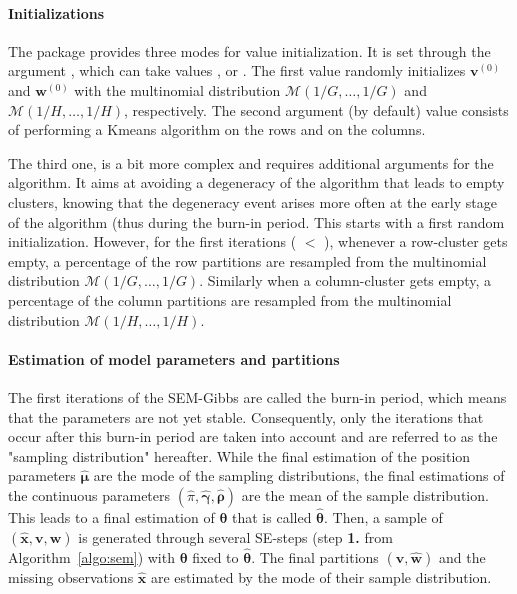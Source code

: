 \paragraph{Initializations} The  package provides three modes for value initialization. It is set through the argument , which can take values ,  or . The first value randomly initializes $\boldsymbol{v}^{\left(0\right)}$ and $\boldsymbol{w}^{\left(0\right)}$ with the multinomial distribution $\mathcal{M}\left(1/G,\ldots,1/G\right)$ and $\mathcal{M}\left(1/H,\ldots,1/H\right)$, respectively. The second argument (by default) value consists of performing a Kmeans algorithm \citep{Hartigan79} on the rows and on the columns. 

The third one,  is a bit more complex and requires additional arguments for the algorithm. It aims at avoiding a degeneracy of the algorithm that leads to empty clusters, knowing that the degeneracy event arises more often at the early stage of the algorithm (thus during the burn-in period. This starts with a first random initialization. However, for the first  iterations ( $<$ ), whenever a row-cluster gets empty, a percentage  of the row partitions are resampled from the multinomial distribution $\mathcal{M}\left(1/G,\ldots,1/G\right)$. Similarly when a column-cluster gets empty, a percentage of the column partitions are resampled from the multinomial distribution $\mathcal{M}\left(1/H,\ldots,1/H\right)$.

\paragraph{Estimation of model parameters and partitions}
The first iterations of the SEM-Gibbs are called the burn-in period, which means that the parameters are not yet stable. Consequently, only the iterations that occur after this burn-in period are taken into account and are referred to as the "sampling distribution" hereafter. While the final estimation of the position parameters $\hat{\boldsymbol{\mu}}$ are the mode of the sampling distributions, the final estimations of the continuous parameters $\left(\hat{\pi},\hat{\boldsymbol{\gamma}},\hat{\boldsymbol{\rho}}\right)$ are the mean of the sample distribution. This leads to a final estimation of $\boldsymbol{\theta}$ that is called $\hat{\boldsymbol{\theta}}$. Then, a sample of $\left(\hat{\boldsymbol{x}},\boldsymbol{v},\boldsymbol{w}\right)$ is generated through several SE-steps (step {\bf 1.} from Algorithm~\ref{algo:sem}) with $\boldsymbol{\theta}$ fixed to $\hat{\boldsymbol{\theta}}$. The final partitions $\left(\hat{\boldsymbol{v}},\hat{\boldsymbol{w}}\right)$ and the missing observations $\hat{\boldsymbol{x}}$ are estimated by the mode of their sample distribution.

